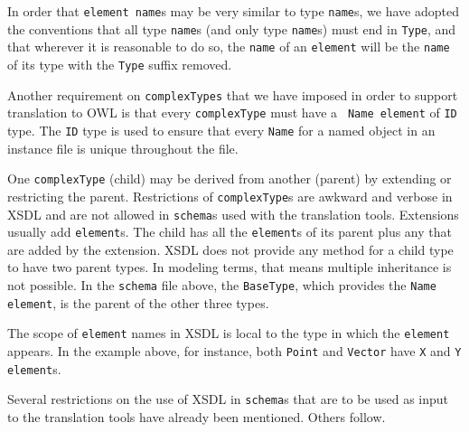 \documentclass[preprint,12pt]{elsarticle}
\begin{document}
In order that {\tt element name}s may be very similar to type {\tt name}s,
we have adopted the conventions that all type {\tt name}s (and only type
{\tt name}s) must end in {\tt Type}, and that wherever it is reasonable to
do so, the {\tt name} of an {\tt element} will be the {\tt name} of its
type with the {\tt Type} suffix removed.

Another requirement on {\tt complexTypes} that we have imposed in order to
support translation to OWL is that every {\tt complexType} must have a {\tt
  Name element} of {\tt ID} type. The {\tt ID} type is used to ensure that
every {\tt Name} for a named object in an instance file is unique
throughout the file.

One {\tt complexType} (child) may be derived from another (parent) by
extending or restricting the parent. Restrictions of {\tt complexType}s are
awkward and verbose in XSDL and are not allowed in {\tt schema}s used with
the translation tools. Extensions usually add {\tt element}s. The child has
all the {\tt element}s of its parent plus any that are added by the
extension. XSDL does not provide any method for a child type to have two
parent types. In modeling terms, that means multiple inheritance is not
possible. In the {\tt schema} file above, the {\tt BaseType}, which
provides the {\tt Name element}, is the parent of the other three types.

The scope of {\tt element} names in XSDL is local to the type in which the
{\tt element} appears. In the example above, for instance, both {\tt Point}
and {\tt Vector} have {\tt X} and {\tt Y} {\tt element}s.

Several restrictions on the use of XSDL in {\tt schema}s that are to be
used as input to the translation tools have already been mentioned. Others
follow.

\renewcommand{\descriptionlabel}[1]{\hspace{\labelsep}\emph{#1}}
\end{document}
